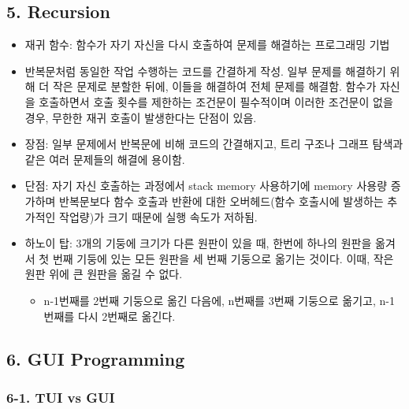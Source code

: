 \hypertarget{recursion}{%
\subsection{5. Recursion}\label{recursion}}

\begin{itemize}
\tightlist
\item
  재귀 함수: 함수가 자기 자신을 다시 호출하여 문제를 해결하는 프로그래밍
  기법
\item
  반복문처럼 동일한 작업 수행하는 코드를 간결하게 작성. 일부 문제를
  해결하기 위해 더 작은 문제로 분할한 뒤에, 이들을 해결하여 전체 문제를
  해결함. 함수가 자신을 호출하면서 호출 횟수를 제한하는 조건문이
  필수적이며 이러한 조건문이 없을 경우, 무한한 재귀 호출이 발생한다는
  단점이 있음.
\item
  장점: 일부 문제에서 반복문에 비해 코드의 간결해지고, 트리 구조나
  그래프 탐색과 같은 여러 문제들의 해결에 용이함.
\item
  단점: 자기 자신 호출하는 과정에서 stack memory 사용하기에 memory
  사용량 증가하며 반복문보다 함수 호출과 반환에 대한 오버헤드(함수
  호출시에 발생하는 추가적인 작업량)가 크기 때문에 실행 속도가 저하됨.
\item
  하노이 탑: 3개의 기둥에 크기가 다른 원판이 있을 때, 한번에 하나의
  원판을 옮겨서 첫 번째 기둥에 있는 모든 원판을 세 번째 기둥으로 옮기는
  것이다. 이때, 작은 원판 위에 큰 원판을 옮길 수 없다.

  \begin{itemize}
  \tightlist
  \item
    n-1번째를 2번째 기둥으로 옮긴 다음에, n번째를 3번째 기둥으로 옮기고,
    n-1번째를 다시 2번째로 옮긴다.
  \end{itemize}
\end{itemize}



\hypertarget{gui-programming}{%
\subsection{6. GUI Programming}\label{gui-programming}}

\hypertarget{tui-vs-gui}{%
\subsubsection{6-1. TUI vs GUI}\label{tui-vs-gui}}

